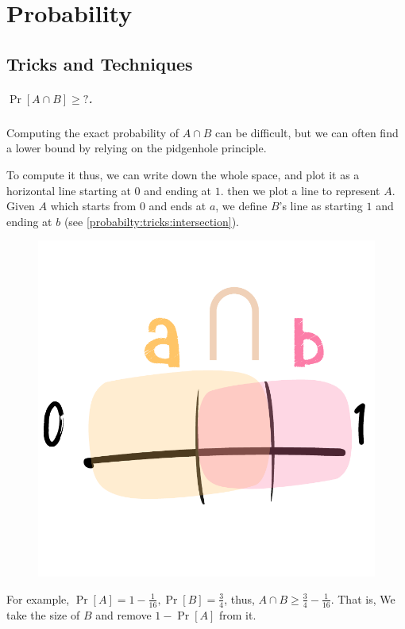 \chapter{Probability}

\section{Tricks and Techniques}

\paragraph{$\Pr{[A\cap B]}\ge ?$.}
Computing the exact probability of $A\cap B$ can be difficult, but we can often find a lower bound
by relying on the pidgenhole principle.

To compute it thus, we can write down the whole space, and plot it as a 
horizontal line starting at $0$ and ending at $1$.
then we plot a line to represent $A$. Given $A$ which starts from $0$ and ends at $a$,
we define $B$'s line as starting $1$ and ending at $b$ (see \autoref{probabilty:tricks:intersection}).

\begin{figure}
    \includegraphics[scale=0.75]{mathematics/illustrations/AcapB.pdf}
\end{figure}\label{probabilty:tricks:intersection}

For example, $\Pr[A]=1-\frac{1}{16}, \Pr[B]=\frac{3}{4}$, thus, $A\cap B \ge \frac{3}{4}-\frac{1}{16}$. That is, 
We take the size of $B$ and remove $1-\Pr[A]$ from it.
